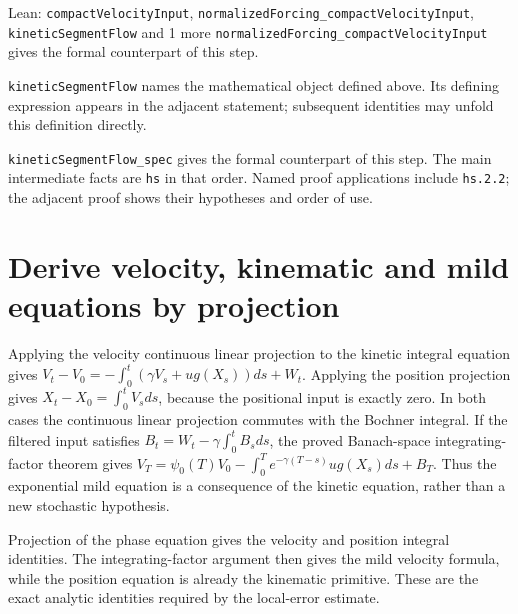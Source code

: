 \documentclass[11pt,a4paper]{article}
\begin{document}
\begin{leanbox}{Lean: \texttt{compactVelocityInput}, \texttt{normalizedForcing\_\allowbreak{}compactVelocityInput}, \texttt{kineticSegmentFlow} and 1 more}
\texttt{normalized\allowbreak{}Forcing\_\allowbreak{}compact\allowbreak{}Velocity\allowbreak{}Input} gives the formal counterpart of this step.




\texttt{kinetic\allowbreak{}Segment\allowbreak{}Flow} names the mathematical object defined above. Its defining expression appears in the adjacent statement; subsequent identities may unfold this definition directly.




\texttt{kinetic\allowbreak{}Segment\allowbreak{}Flow\_\allowbreak{}spec} gives the formal counterpart of this step. The main intermediate facts are \texttt{hs} in that order. Named proof applications include \texttt{hs.\allowbreak{}2.\allowbreak{}2}; the adjacent proof shows their hypotheses and order of use.
\end{leanbox}

\section{\texorpdfstring{Derive velocity, kinematic and mild equations by projection}{Derive velocity, kinematic and mild equations by projection}}


Applying the velocity continuous linear projection to the kinetic integral equation gives \(V_t-V_0=-\int_0^t(\gamma V_s+u g(X_s))ds+W_t\). Applying the position projection gives \(X_t-X_0=\int_0^tV_sds\), because the positional input is exactly zero. In both cases the continuous linear projection commutes with the Bochner integral. If the filtered input satisfies \(B_t=W_t-\gamma\int_0^tB_sds\), the proved Banach-space integrating-factor theorem gives \(V_T=\psi_0(T)V_0-\int_0^Te^{-\gamma(T-s)}u g(X_s)ds+B_T\). Thus the exponential mild equation is a consequence of the kinetic equation, rather than a new stochastic hypothesis.



Projection of the phase equation gives the velocity and position integral identities. The integrating-factor argument then gives the mild velocity formula, while the position equation is already the kinematic primitive. These are the exact analytic identities required by the local-error estimate.
\end{document}
